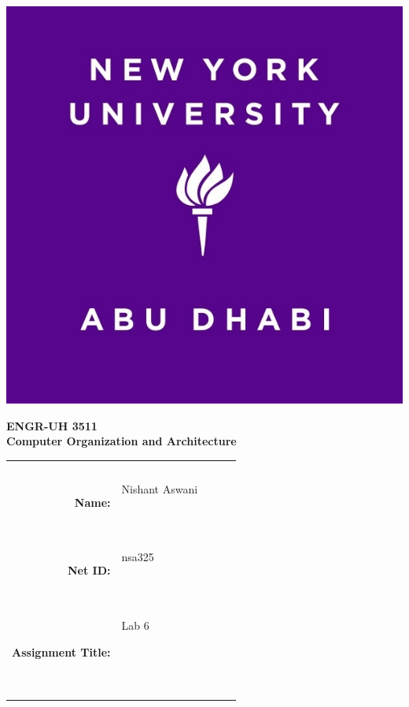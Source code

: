 \documentclass[twocolumn]{article}
\title{\myassignmenttitle}
\author{\myname, \myemail}
\affil{\myclassname (\mycoursenumber), Instructor \myinstructor}
\date{}
\newcommand{\myname}{Nishant Aswani}
\newcommand{\mynetid}{nsa325}
\newcommand{\myhwtype}{Lab }
\newcommand{\myhwnum}{6}
\newcommand{\mycoursenumber}{ENGR-UH 3511}
\newcommand{\myclassname}{Computer Organization and Architecture}
\begin{document}
\onecolumn
\pagestyle{fancy}
\fancyhf{}
\renewcommand{\headrulewidth}{0pt}

\begin{center}
  \includegraphics[scale=0.15]{etc/NYUAD-alt-logo.jpg}
\end{center}

{\vspace{2.5em}}

\begin{center}
    \Huge{\textbf{\mycoursenumber}}\\
    {\vspace{0.5em}}
    \Huge{\textbf{\myclassname}}
\end{center}

{\vspace{10em}}

\begin{center}
  \begin{tabular}{|rp{5.0cm}lll|}
    \hline
    &  &  &  & \\
    &  &  &  & \\
    \Large{\textbf{Name:}} & \Large{\myname}
    
    \  &  &  & \\
    \Large{\textbf{Net ID:}} & \Large{\mynetid}
    
    \  &  &  & \\
    \Large{\textbf{Assignment Title:}} & \Large{\myhwtype \myhwnum}
    
    \
    
    \  &  &  & \\
    \hline
  \end{tabular}
\end{center}
\end{document}
